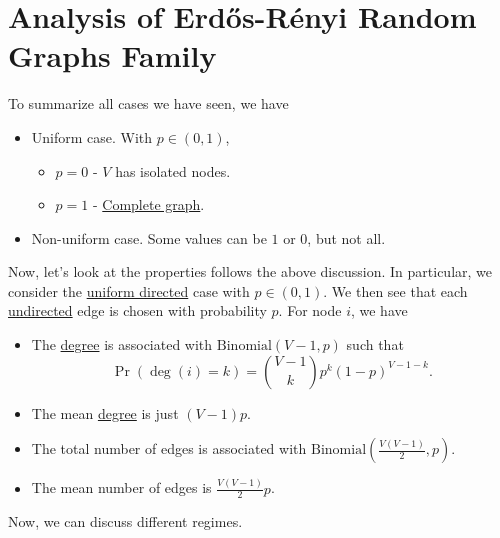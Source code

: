 \section{Analysis of Erdős-Rényi Random Graphs Family}
\begin{prev}
	To summarize all cases we have seen, we have
	\begin{itemize}
		\item Uniform case. With \(p\in(0, 1)\),
		      \begin{itemize}
			      \item \(p = 0\) - \(V\) has isolated nodes.
			      \item \(p = 1\) - \hyperref[def:complete-graph]{Complete graph}.
		      \end{itemize}
		\item Non-uniform case. Some values can be \(1\) or \(0\), but not all.
	\end{itemize}
\end{prev}

Now, let's look at the properties follows the above discussion. In particular, we consider the
\hyperref[subsec:uniform-and-directed-model]{uniform directed} case with \(p\in(0, 1)\). We then see that each \hyperref[def:undirected-graph]{undirected}
edge is chosen with probability \(p\). For node \(i\), we have
\begin{itemize}
	\item The \hyperref[def:degree]{degree} is associated with
	      \(\mathrm{Binomial}(V-1, p)\) such that
	      \[
		      \Pr(\deg(i) = k) = \binom{V-1}{k}p^k (1 - p)^{V-1-k}.
	      \]
	\item The mean \hyperref[def:degree]{degree} is just \((V-1)p\).
	\item The total number of edges is associated with \(\mathrm{Binomial}\left(\frac{V(V-1)}{2}, p\right)\).
	\item The mean number of edges is \(\frac{V(V-1)}{2}p\).
\end{itemize}

Now, we can discuss different regimes.
